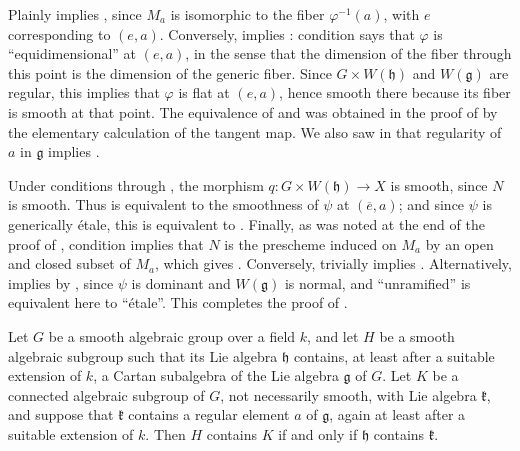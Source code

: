 Plainly  implies , since \(M_a\) is isomorphic to the fiber
\(\varphi^{-1}(a)\), with \(e\) corresponding to \((e,a)\).
Conversely,  implies : condition  says that \(\varphi\) is
``equidimensional'' at \((e,a)\), in the sense that the dimension of
the fiber through this point is the dimension of the generic fiber.
Since \(G\times W(\mathfrak h)\) and \(W(\mathfrak g)\) are regular,
this implies that \(\varphi\) is flat at \((e,a)\), hence smooth there
because its fiber is smooth at that point. The equivalence of  and
 was obtained in the proof of  by the elementary
calculation of the tangent map. We also saw in  that regularity
of \(a\) in \(\mathfrak g\) implies .

Under conditions  through , the morphism
\(q:G\times W(\mathfrak h)\to X\) is smooth, since \(N\) is smooth.
Thus  is equivalent to the smoothness of \(\psi\) at
\((\overline e,a)\); and since \(\psi\) is generically étale, this is
equivalent to . Finally, as was noted at the end of the proof of
, condition  implies that \(N\) is the prescheme induced on
\(M_a\) by an open and closed subset of \(M_a\), which gives .
Conversely,  trivially implies . Alternatively,  implies
 by , since \(\psi\) is dominant and \(W(\mathfrak g)\) is
normal, and ``unramified'' is equivalent here to ``étale''. This
completes the proof of .

\begin{corollary}
Let \(G\) be a smooth algebraic group over a field \(k\), and let
\(H\) be a smooth algebraic subgroup such that its Lie algebra
\(\mathfrak h\) contains, at least after a suitable extension of
\(k\), a Cartan subalgebra of the Lie algebra \(\mathfrak g\) of
\(G\). Let \(K\) be a connected algebraic subgroup of \(G\), not
necessarily smooth, with Lie algebra \(\mathfrak k\), and suppose that
\(\mathfrak k\) contains a regular element \(a\) of \(\mathfrak g\),
again at least after a suitable extension of \(k\). Then \(H\)
contains \(K\) if and only if \(\mathfrak h\) contains
\(\mathfrak k\).
\end{corollary}

